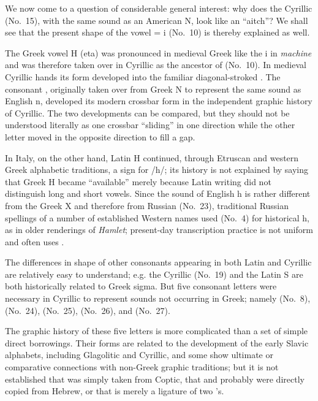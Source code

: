 We now come to a question of considerable general interest: why does the Cyrillic  (No.~15), with the same sound as an American N, look like an ``aitch''? We shall see that the present shape of the vowel  = i (No.~10) is thereby explained as well.

The Greek vowel Η (eta) was pronounced in medieval Greek like the i in \emph{machine} and was therefore taken over in Cyrillic as the ancestor of  (No.~10). In medieval Cyrillic hands its form developed into the familiar diagonal-stroked . The consonant , originally taken over from Greek Ν to represent the same sound as English n, developed its modern crossbar form in the independent graphic history of Cyrillic. The two developments can be compared, but they should not be understood literally as one crossbar ``sliding'' in one direction while the other letter moved in the opposite direction to fill a gap.

In Italy, on the other hand, Latin H continued, through Etruscan and western Greek alphabetic traditions, a sign for /h/; its history is not explained by saying that Greek Η became ``available'' merely because Latin writing did not distinguish long and short vowels. Since the sound of English h is rather different from the Greek Χ and therefore from Russian  (No.~23), traditional Russian spellings of a number of established Western names used  (No.~4) for historical h, as in older renderings of \emph{Hamlet}; present-day transcription practice is not uniform and often uses .

The differences in shape of other consonants appearing in both Latin and Cyrillic are relatively easy to understand; e.g. the Cyrillic  (No.~19) and the Latin S are both historically related to Greek sigma. But five consonant letters were necessary in Cyrillic to represent sounds not occurring in Greek; namely  (No.~8),  (No.~24),  (No.~25),  (No.~26), and  (No.~27).

The graphic history of these five letters is more complicated than a set of simple direct borrowings. Their forms are related to the development of the early Slavic alphabets, including Glagolitic and Cyrillic, and some show ultimate or comparative connections with non-Greek graphic traditions; but it is not established that  was simply taken from Coptic, that  and probably  were directly copied from Hebrew, or that  is merely a ligature of two 's.

